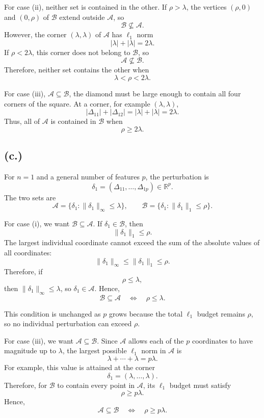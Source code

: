 \documentclass{article}
\begin{document}
For case (ii), neither set is contained in the other. If
$\rho>\lambda$, the vertices $(\rho,0)$ and $(0,\rho)$ of $\mathcal B$
extend outside $\mathcal A$, so
\[
\mathcal B\not\subseteq\mathcal A.
\]
However, the corner $(\lambda,\lambda)$ of $\mathcal A$ has
$\ell_1$ norm
\[
|\lambda|+|\lambda|=2\lambda.
\]
If $\rho<2\lambda$, this corner does not belong to $\mathcal B$, so
\[
\mathcal A\not\subseteq\mathcal B.
\]
Therefore, neither set contains the other when
\[
\boxed{\lambda<\rho<2\lambda}.
\]


For case (iii), $\mathcal A\subseteq\mathcal B$, the diamond must be
large enough to contain all four corners of the square. At a corner,
for example $(\lambda,\lambda)$,
\[
|\Delta_{11}|+|\Delta_{12}|
=
|\lambda|+|\lambda|
=
2\lambda.
\]
Thus, all of $\mathcal A$ is contained in $\mathcal B$ when
\[
\boxed{\rho\geq2\lambda}.
\]




\vspace{7mm}
\subsection*{(c.)}


For $n=1$ and a general number of features $p$, the perturbation is
\[
\delta_1=(\Delta_{11},\ldots,\Delta_{1p})\in\mathbb{R}^p.
\]
The two sets are
\[
\mathcal A
=
\{\delta_1:\|\delta_1\|_\infty\leq\lambda\},
\qquad
\mathcal B
=
\{\delta_1:\|\delta_1\|_1\leq\rho\}.
\]


For case (i), we want $\mathcal B\subseteq\mathcal A$. If
$\delta_1\in\mathcal B$, then
\[
\|\delta_1\|_1\leq\rho.
\]
The largest individual coordinate cannot exceed the sum of the absolute
values of all coordinates: 
\[
\|\delta_1\|_\infty
\leq
\|\delta_1\|_1
\leq
\rho.
\]
Therefore, if
\[
\rho\leq\lambda,
\]
then $\|\delta_1\|_\infty\leq\lambda$, so $\delta_1\in\mathcal A$.
Hence,
\[
\boxed{
\mathcal B\subseteq\mathcal A
\quad\Longleftrightarrow\quad
\rho\leq\lambda.
}
\]

This condition is unchanged as $p$ grows because the total $\ell_1$
budget remains $\rho$, so no individual perturbation can exceed $\rho$.


\vspace{5mm}
For case (iii), we want $\mathcal A\subseteq\mathcal B$.
Since $\mathcal A$ allows each of the $p$ coordinates to have magnitude
up to $\lambda$, the largest possible $\ell_1$ norm in $\mathcal A$ is
\[
\lambda+\cdots+\lambda=p\lambda.
\]
For example, this value is attained at the corner 
\[
\delta_1=(\lambda,\ldots,\lambda).
\]
Therefore, for $\mathcal B$ to contain every point in $\mathcal A$, its
$\ell_1$ budget must satisfy
\[
\rho\geq p\lambda.
\]
Hence,
\[
\boxed{
\mathcal A\subseteq\mathcal B
\quad\Longleftrightarrow\quad
\rho\geq p\lambda.}
\]
\end{document}
